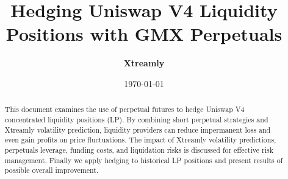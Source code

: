 \documentclass[12pt]{article}
\begin{document}
\title{\textbf{Hedging Uniswap V4 Liquidity Positions with GMX Perpetuals}}
\author{%
  \textbf{Xtreamly}%
}
\date{\today}
\maketitle

\begin{abstract}
This document examines the use of perpetual futures to hedge Uniswap V4 concentrated liquidity positions (LP). By combining short perpetual strategies and Xtreamly volatility prediction, liquidity providers can reduce impermanent loss and even gain profits on price fluctuations. The impact of Xtreamly volatility predictions, perpetuals leverage, funding costs, and liquidation risks is discussed for effective risk management.
Finally we apply hedging to historical LP positions and present results of possible overall improvement.
\end{abstract}
\end{document}
